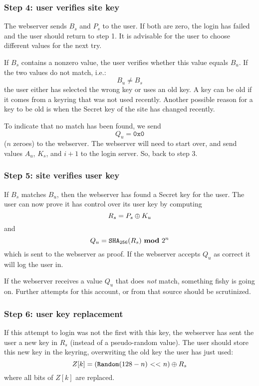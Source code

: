 \subsubsection{Step 4: user verifies site key}
\label{sec:login_step4}
The webserver sends $B_s$ and $P_s$ to the user.
If both are zero, the login has failed and the user should return to step 1.
It is advisable for the user to choose different values for the next try.
\par
If $B_s$ contains a nonzero value, the user verifies whether this value equals $B_u$.
If the two values do not match,
i.e.:
\[B_u \neq B_s\]
the user either has selected the wrong key or uses an old key.
A key can be old if it comes from a keyring that was not used recently.
Another possible reason for a key to be old is when the Secret key of the site has changed recently.
\par
To indicate that no match has been found, we send
\[Q_u=\mathtt{0x0}\]
($n$ zeroes) to the webserver.
The webserver will need to start over, and send values $A_u$, $K_s$, and $i+1$ to the login server.
So, back to step 3.

\subsubsection{Step 5: site verifies user key}
\label{sec:login_step5}
If $B_s$ matches $B_u$, then the webserver has found a Secret key for the user.
The user can now prove it has control over its user key by computing
\[R_s=P_s\oplus K_u\]
and
\[Q_u=\texttt{\ensuremath{\mathtt{SHA_{256}}}}(R_s)\ \textbf{mod}\ 2^{n}\]
which is sent to the webserver as proof.
If the webserver accepts $Q_u$ as correct it will log the user in.
\par
If the webserver receives a value $Q_u$ that does \emph{not} match,
something fishy is going on.
Further attempts for this account, or from that source should be scrutinized.

\subsubsection{Step 6: user key replacement}
\label{sec:login_step6}
If this attempt to login was not the first with this key,
the webserver has sent the user a new key in $R_s$ (instead of a pseudo-random value).
The user should store this new key in the keyring, overwriting the old key the user has just used:
\[Z[k]=\xor{(\F{Random}{128-n}\ \mathbf{<<}\ n)}{R_s}\]
where all bits of $Z[k]$ are replaced.

